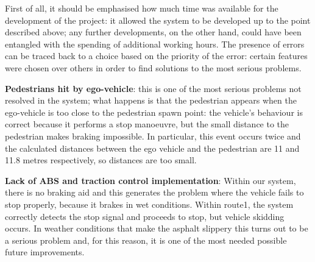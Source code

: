 \documentclass{article}
\begin{document}
First of all, it should be emphasised how much time was available for the development of the project: it allowed the system to 
be developed up to the point described above; any further developments, on the other hand, could have been entangled with the 
spending of additional working hours. 
The presence of errors can be traced back to a choice based on the priority of the error: certain features were chosen over 
others in order to find solutions to the most serious problems.

\textbf{Pedestrians hit by ego-vehicle}: this is one of the most serious problems not resolved in the system; what 
    happens is that the pedestrian appears when the ego-vehicle is too close to the pedestrian spawn point: the vehicle's behaviour 
    is correct because it performs a stop manoeuvre, but the small distance to the pedestrian makes braking impossible. 
    In particular, this event occurs twice and the calculated distances between the ego vehicle and the pedestrian are 11 and 
    11.8 metres respectively, so distances are too small.

\textbf{Lack of ABS and traction control implementation}: Within our system, there is no braking aid and this generates the 
problem where the vehicle fails to stop properly, because it brakes in wet conditions. 
Within route1, the system correctly detects the stop signal and proceeds to stop, but vehicle skidding occurs.
In weather conditions that make the asphalt slippery this turns out to be a serious problem and, for this reason, it is one 
of the most needed possible future improvements.
\end{document}
